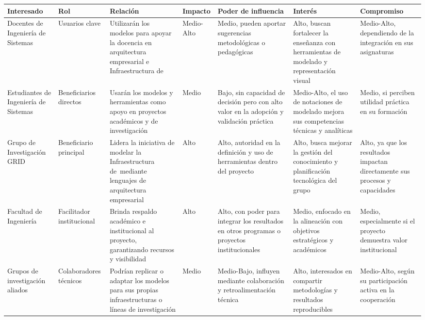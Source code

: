 \begin{table}[H]
	\centering
	\fontsize{7}{7}\selectfont
	\setlength{\tabcolsep}{3pt}
	\renewcommand{\arraystretch}{1.4}
	\begin{tabularx}{\textwidth}{%
		>{\raggedright\arraybackslash}p{1.7cm}  
		>{\raggedright\arraybackslash}p{1.5cm}    
		>{\raggedright\arraybackslash}p{2.3cm}  
		>{\raggedright\arraybackslash}p{1.4cm}  
		>{\raggedright\arraybackslash}p{2.0cm}  
		>{\raggedright\arraybackslash}p{2.5cm}    
		>{\raggedright\arraybackslash}p{2.0cm}} 
		\toprule
		\textbf{Interesado} & \textbf{Rol} & \textbf{Relación} & \textbf{Impacto} & \textbf{Poder de influencia} & \textbf{Interés} & \textbf{Compromiso} \\
		\midrule
		Docentes de Ingeniería de Sistemas & Usuarios clave & Utilizarán los modelos para apoyar la docencia en arquitectura empresarial e Infraestructura de~\TI & Medio-Alto & Medio, pueden aportar sugerencias metodológicas o pedagógicas & Alto, buscan fortalecer la enseñanza con herramientas de modelado y representación visual & Medio-Alto, dependiendo de la integración en sus asignaturas \\
		\midrule
		Estudiantes de Ingeniería de Sistemas & Beneficiarios directos & Usarán los modelos y herramientas como apoyo en proyectos académicos y de investigación & Medio & Bajo, sin capacidad de decisión pero con alto valor en la adopción y validación práctica & Medio-Alto, el uso de notaciones de modelado mejora sus competencias técnicas y analíticas & Medio, si perciben utilidad práctica en su formación \\
		\midrule
		Grupo de Investigación GRID & Beneficiario principal & Lidera la iniciativa de modelar la Infraestructura de~\TI mediante lenguajes de arquitectura empresarial & Alto & Alto, autoridad en la definición y uso de herramientas dentro del proyecto & Alto, busca mejorar la gestión del conocimiento y planificación tecnológica del grupo & Alto, ya que los resultados impactan directamente sus procesos y capacidades \\
		\midrule
		Facultad de Ingeniería & Facilitador institucional & Brinda respaldo académico e institucional al proyecto, garantizando recursos y visibilidad & Alto & Alto, con poder para integrar los resultados en otros programas o proyectos institucionales & Medio, enfocado en la alineación con objetivos estratégicos y académicos & Medio, especialmente si el proyecto demuestra valor institucional \\
		\midrule
		Grupos de investigación aliados & Colaboradores técnicos & Podrían replicar o adaptar los modelos para sus propias infraestructuras o líneas de investigación & Medio & Medio-Bajo, influyen mediante colaboración y retroalimentación técnica & Alto, interesados en compartir metodologías y resultados reproducibles & Medio-Alto, según su participación activa en la cooperación \\

\end{tabularx}
\end{table}
